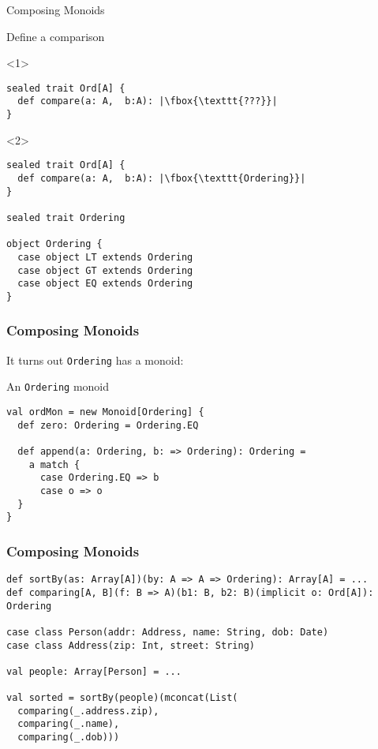 \documentclass{beamer}
\begin{document}
\begin{frame}[fragile]{Composing Monoids}

  \begin{block}{Define a comparison}
  \begin{onlyenv}<1>
  \begin{lstlisting}[escapechar=\|]
sealed trait Ord[A] {
  def compare(a: A,  b:A): |\fbox{\texttt{???}}|
}
\end{lstlisting}
\end{onlyenv}

\begin{onlyenv}<2>
\begin{lstlisting}[escapechar=\|]
sealed trait Ord[A] {
  def compare(a: A,  b:A): |\fbox{\texttt{Ordering}}|
}

sealed trait Ordering

object Ordering {
  case object LT extends Ordering
  case object GT extends Ordering
  case object EQ extends Ordering
}

  \end{lstlisting}
  \end{onlyenv}
  \end{block}

\end{frame}

\begin{frame}[fragile]
  \frametitle{Composing Monoids}
  It turns out \texttt{Ordering} has a monoid:

  \begin{block}{An \texttt{Ordering} monoid}
  \begin{lstlisting}
val ordMon = new Monoid[Ordering] {
  def zero: Ordering = Ordering.EQ

  def append(a: Ordering, b: => Ordering): Ordering =
    a match {
      case Ordering.EQ => b
      case o => o
  }
}
  \end{lstlisting}
  \end{block}
\end{frame}

\begin{frame}[fragile]
  \frametitle{Composing Monoids}
  \begin{block}{}
  \begin{lstlisting}
def sortBy(as: Array[A])(by: A => A => Ordering): Array[A] = ...
def comparing[A, B](f: B => A)(b1: B, b2: B)(implicit o: Ord[A]): Ordering

case class Person(addr: Address, name: String, dob: Date)
case class Address(zip: Int, street: String)

val people: Array[Person] = ...

val sorted = sortBy(people)(mconcat(List(
  comparing(_.address.zip),
  comparing(_.name),
  comparing(_.dob)))

  \end{lstlisting}
  \end{block}
\end{frame}
\end{document}
